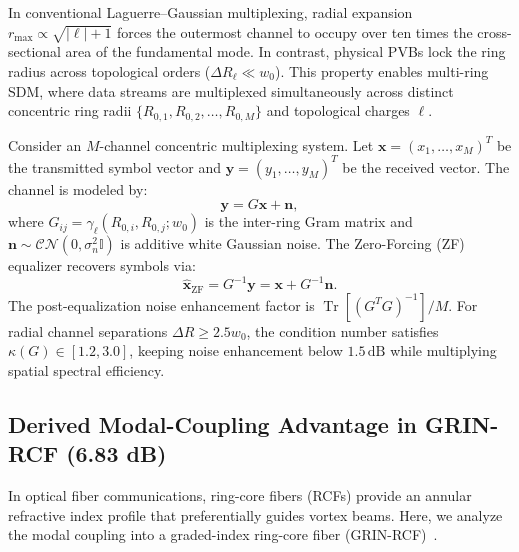 \documentclass{optica-article}
\begin{document}
In conventional Laguerre--Gaussian multiplexing, radial expansion $r_{\max} \propto \sqrt{|\ell| + 1}$ forces the outermost channel to occupy over ten times the cross-sectional area of the fundamental mode. In contrast, physical PVBs lock the ring radius across topological orders ($\Delta R_\ell \ll w_0$). This property enables multi-ring SDM, where data streams are multiplexed simultaneously across distinct concentric ring radii $\{R_{0, 1}, R_{0, 2}, \dots, R_{0, M}\}$ and topological charges $\ell$.

Consider an $M$-channel concentric multiplexing system. Let $\mathbf{x} = (x_1, \dots, x_M)^T$ be the transmitted symbol vector and $\mathbf{y} = (y_1, \dots, y_M)^T$ be the received vector. The channel is modeled by:
\begin{equation}
\mathbf{y} = G \mathbf{x} + \mathbf{n},
\label{eq:channel_model}
\end{equation}
where $G_{ij} = \gamma_\ell(R_{0, i}, R_{0, j}; w_0)$ is the inter-ring Gram matrix and $\mathbf{n} \sim \mathcal{CN}(0, \sigma_n^2 \mathbb{I})$ is additive white Gaussian noise. The Zero-Forcing (ZF) equalizer recovers symbols via:
\begin{equation}
\hat{\mathbf{x}}_{\text{ZF}} = G^{-1} \mathbf{y} = \mathbf{x} + G^{-1} \mathbf{n}.
\label{eq:zf_equalizer}
\end{equation}
The post-equalization noise enhancement factor is $\operatorname{Tr}[(G^T G)^{-1}] / M$. For radial channel separations $\Delta R \ge 2.5 w_0$, the condition number satisfies $\kappa(G) \in [1.2, 3.0]$, keeping noise enhancement below $1.5\,\text{dB}$ while multiplying spatial spectral efficiency.

\subsection{Derived Modal-Coupling Advantage in GRIN-RCF (6.83 dB)}
\label{sec:rcf_coupling_683db}

In optical fiber communications, ring-core fibers (RCFs) provide an annular refractive index profile that preferentially guides vortex beams. Here, we analyze the modal coupling into a graded-index ring-core fiber (GRIN-RCF)~\cite{Villalba2023,Brunet2014}.
\end{document}
